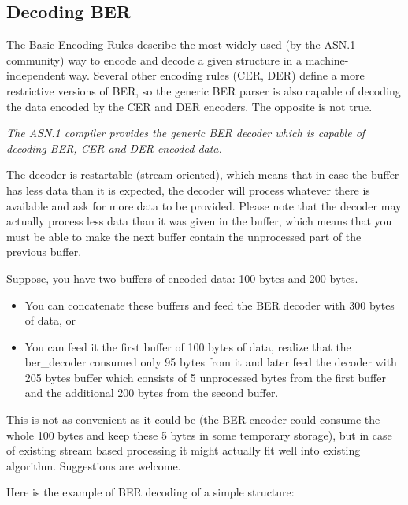 \documentclass[english,oneside,12pt]{book}
\begin{document}
\subsection{\label{sub:Decoding-BER}Decoding BER}

The Basic Encoding Rules describe the most widely used (by the ASN.1
community) way to encode and decode a given structure in a machine-independent
way. Several other encoding rules (CER, DER) define a more restrictive
versions of BER, so the generic BER parser is also capable of decoding
the data encoded by the CER and DER encoders. The opposite is not true.

\emph{The ASN.1 compiler provides the generic BER decoder which is
capable of decoding BER, CER and DER encoded data.}

The decoder is restartable (stream-oriented), which means that in
case the buffer has less data than it is expected, the decoder will
process whatever there is available and ask for more data to be provided.
Please note that the decoder may actually process less data than it
was given in the buffer, which means that you must be able to make
the next buffer contain the unprocessed part of the previous buffer.

Suppose, you have two buffers of encoded data: 100 bytes and 200 bytes.
\begin{itemize}
\item You can concatenate these buffers and feed the BER decoder with 300
bytes of data, or
\item You can feed it the first buffer of 100 bytes of data, realize that
the ber\_decoder consumed only 95 bytes from it and later feed the
decoder with 205 bytes buffer which consists of 5 unprocessed bytes
from the first buffer and the additional 200 bytes from the second
buffer.
\end{itemize}
This is not as convenient as it could be (the BER encoder could
consume the whole 100 bytes and keep these 5 bytes in some temporary
storage), but in case of existing stream based processing it might
actually fit well into existing algorithm. Suggestions are welcome.

Here is the example of BER decoding of a simple structure:

\end{document}
